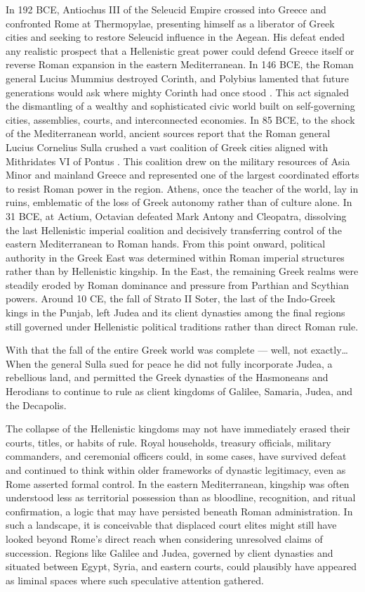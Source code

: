 In 192 BCE, Antiochus III of the Seleucid Empire crossed into Greece and confronted Rome at Thermopylae, presenting himself as a liberator of Greek cities and seeking to restore Seleucid influence in the Aegean.
His defeat ended any realistic prospect that a Hellenistic great power could defend Greece itself or reverse Roman expansion in the eastern Mediterranean.
In 146 BCE, the Roman general Lucius Mummius destroyed Corinth, and Polybius lamented that future generations would ask where mighty Corinth had once stood \cite[39.2]{polybius:histories}.
This act signaled the dismantling of a wealthy and sophisticated civic world built on self-governing cities, assemblies, courts, and interconnected economies.
In 85 BCE, to the shock of the Mediterranean world, ancient sources report that the Roman general Lucius Cornelius Sulla crushed a vast coalition of Greek cities aligned with Mithridates VI of Pontus \cite{appian:romanhistory}.
This coalition drew on the military resources of Asia Minor and mainland Greece and represented one of the largest coordinated efforts to resist Roman power in the region.
Athens, once the teacher of the world, lay in ruins, emblematic of the loss of Greek autonomy rather than of culture alone.
In 31 BCE, at Actium, Octavian defeated Mark Antony and Cleopatra, dissolving the last Hellenistic imperial coalition and decisively transferring control of the eastern Mediterranean to Roman hands.
From this point onward, political authority in the Greek East was determined within Roman imperial structures rather than by Hellenistic kingship.
In the East, the remaining Greek realms were steadily eroded by Roman dominance and pressure from Parthian and Scythian powers.
Around 10 CE, the fall of Strato II Soter, the last of the Indo-Greek kings in the Punjab, left Judea and its client dynasties among the final regions still governed under Hellenistic political traditions rather than direct Roman rule.

With that the fall of the entire Greek world was complete --- well, not exactly\ldots{}
When the general Sulla sued for peace he did not fully incorporate Judea, a rebellious land, and permitted the Greek dynasties of the Hasmoneans and Herodians to continue to rule as client kingdoms of Galilee, Samaria, Judea, and the Decapolis.

The collapse of the Hellenistic kingdoms may not have immediately erased their courts, titles, or habits of rule.
Royal households, treasury officials, military commanders, and ceremonial officers could, in some cases, have survived defeat and continued to think within older frameworks of dynastic legitimacy, even as Rome asserted formal control.
In the eastern Mediterranean, kingship was often understood less as territorial possession than as bloodline, recognition, and ritual confirmation, a logic that may have persisted beneath Roman administration.
In such a landscape, it is conceivable that displaced court elites might still have looked beyond Rome's direct reach when considering unresolved claims of succession.
Regions like Galilee and Judea, governed by client dynasties and situated between Egypt, Syria, and eastern courts, could plausibly have appeared as liminal spaces where such speculative attention gathered.


